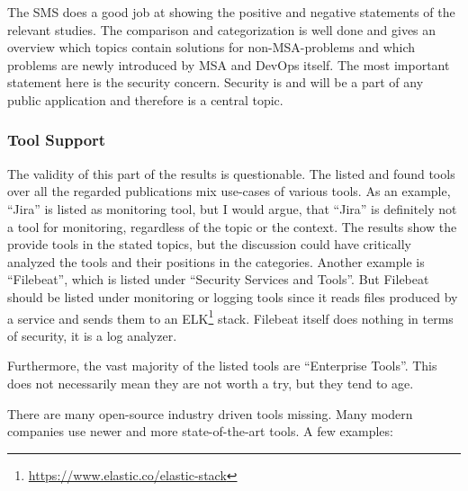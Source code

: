 The SMS does a good job at showing the positive and negative
statements of the relevant studies. The comparison and categorization
is well done and gives an overview which topics contain solutions
for non-MSA-problems and which problems are newly introduced by
MSA and DevOps itself. The most important statement here is the security
concern. Security is and will be a part of any public application
and therefore is a central topic.

\subsubsection{Tool Support}

The validity of this part of the results is questionable.
The listed and found tools over all the regarded publications mix
use-cases of various tools. As an example, ``Jira'' is listed
as monitoring tool, but I would argue, that ``Jira'' is definitely
not a tool for monitoring, regardless of the topic or the context.
The results show the provide tools in the stated topics, but the
discussion could have critically analyzed the tools and their positions
in the categories. Another example is ``Filebeat'', which is listed under
``Security Services and Tools''. But Filebeat should be listed under
monitoring or logging tools since it reads files produced by a service
and sends them to an ELK\footnote{\url{https://www.elastic.co/elastic-stack}} stack.
Filebeat itself does nothing in terms of security, it is a log analyzer.

Furthermore, the vast majority of the listed tools are ``Enterprise Tools''.
This does not necessarily mean they are not worth a try,
but they tend to age.

There are many open-source industry driven tools missing. Many
modern companies use newer and more state-of-the-art tools.
A few examples:

